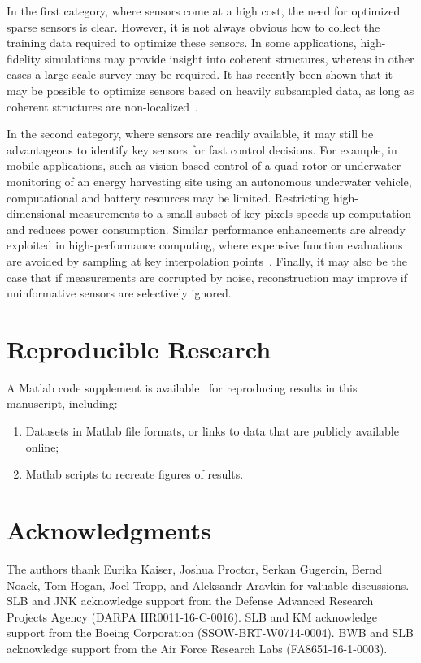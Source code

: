 \documentclass[letterpaper]{IEEEtran}
\newcommand\revision[3][]{%
\ifstrempty{#1}{}%
{\textcolor{black}{}}%
\ifstrempty{#3}{{\color{black}{#2}}}%
{{\color{black}{#2}}}%
}
\begin{document}
In the first category, where sensors come at a high cost, the need for optimized sparse sensors is clear.  However, it is not always obvious how to collect the training data required to optimize these sensors.  In some applications, high-fidelity simulations may provide insight into coherent structures, whereas in other cases a large-scale survey may be required.  It has recently been shown that it may be possible to optimize sensors based on heavily subsampled data, as long as coherent structures are non-localized~\cite{Brunton2016siap}.  

In the second category, where sensors are readily available, it may still be advantageous to identify key sensors for fast control decisions.  
For example, in mobile applications, such as vision-based control of a quad-rotor or underwater monitoring of an energy harvesting site using an autonomous underwater vehicle, computational and battery resources may be limited.  
Restricting high-dimensional measurements to a small subset of key pixels speeds up computation and reduces power consumption.  
Similar performance enhancements are already exploited in high-performance computing, where expensive function evaluations are avoided by sampling at key interpolation points~\cite{Chaturantabut2012siamjna,Chaturantabut2010siamjsc}.  
Finally, it may also be the case that if measurements are corrupted by noise, reconstruction may improve if uninformative sensors are selectively ignored.  

\section*{Reproducible Research}
A Matlab code supplement is available~\cite{manohar2017code} for reproducing results in this manuscript, including:
\begin{enumerate}
	\item Datasets in Matlab file formats, or links to data that are publicly available online;
	\item Matlab scripts to recreate figures of results.
\end{enumerate}


\footnotesize{


}

\newpage
\section*{Acknowledgments}
\normalsize
The authors thank Eurika Kaiser, Joshua Proctor, Serkan Gugercin, Bernd Noack, Tom Hogan, Joel Tropp, and Aleksandr Aravkin for valuable discussions.  
SLB and JNK acknowledge support from the Defense Advanced Research Projects Agency (DARPA HR0011-16-C-0016).  
SLB and KM acknowledge support from the Boeing Corporation (SSOW-BRT-W0714-0004).  
BWB and SLB acknowledge support from the Air Force Research Labs (FA8651-16-1-0003).
\revision[]{SLB acknowledges support from the Air Force Office of Scientific Research (AFOSR FA9550-16-1-0650). JNK acknowledges support from the Air Force Office of Scientific Research (AFOSR FA9550-15-1-0385).}{}
\end{document}
